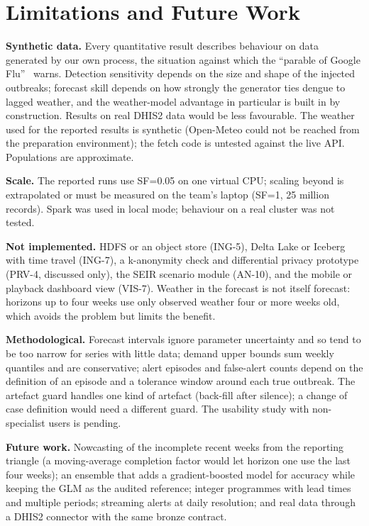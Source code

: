 \section{Limitations and Future Work}\label{sec:limits}
\textbf{Synthetic data.} Every quantitative result describes behaviour on data generated by our own process, the situation against which the ``parable of Google Flu''~\cite{lazer} warns. Detection sensitivity depends on the size and shape of the injected outbreaks; forecast skill depends on how strongly the generator ties dengue to lagged weather, and the weather-model advantage in particular is built in by construction. Results on real DHIS2 data would be less favourable. The weather used for the reported results is synthetic (Open-Meteo could not be reached from the preparation environment); the fetch code is untested against the live API. Populations are approximate.

\textbf{Scale.} The reported runs use SF=0.05 on one virtual CPU; scaling beyond is extrapolated or must be measured on the team's laptop (SF=1, 25 million records). Spark was used in local mode; behaviour on a real cluster was not tested.

\textbf{Not implemented.} HDFS or an object store (ING-5), Delta Lake or Iceberg with time travel (ING-7), a k-anonymity check and differential privacy prototype (PRV-4, discussed only), the SEIR scenario module (AN-10), and the mobile or playback dashboard view (VIS-7). Weather in the forecast is not itself forecast: horizons up to four weeks use only observed weather four or more weeks old, which avoids the problem but limits the benefit.

\textbf{Methodological.} Forecast intervals ignore parameter uncertainty and so tend to be too narrow for series with little data; demand upper bounds sum weekly quantiles and are conservative; alert episodes and false-alert counts depend on the definition of an episode and a tolerance window around each true outbreak. The artefact guard handles one kind of artefact (back-fill after silence); a change of case definition would need a different guard. The usability study with non-specialist users is pending.

\textbf{Future work.} Nowcasting of the incomplete recent weeks from the reporting triangle (a moving-average completion factor would let horizon one use the last four weeks); an ensemble that adds a gradient-boosted model for accuracy while keeping the GLM as the audited reference; integer programmes with lead times and multiple periods; streaming alerts at daily resolution; and real data through a DHIS2 connector with the same bronze contract.
